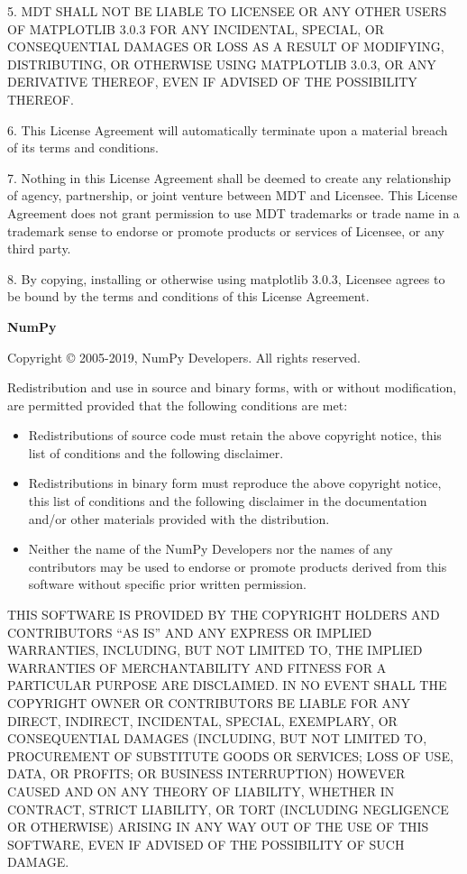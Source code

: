 5. MDT SHALL NOT BE LIABLE TO LICENSEE OR ANY OTHER USERS OF MATPLOTLIB 3.0.3 FOR ANY INCIDENTAL, SPECIAL, OR CONSEQUENTIAL DAMAGES OR LOSS AS A RESULT OF MODIFYING, DISTRIBUTING, OR OTHERWISE USING MATPLOTLIB 3.0.3, OR ANY DERIVATIVE THEREOF, EVEN IF ADVISED OF THE POSSIBILITY THEREOF.

6. This License Agreement will automatically terminate upon a material breach of its terms and conditions.

7. Nothing in this License Agreement shall be deemed to create any relationship of agency, partnership, or joint venture between MDT and Licensee. This License Agreement does not grant permission to use MDT trademarks or trade name in a trademark sense to endorse or promote products or services of Licensee, or any third party.

8. By copying, installing or otherwise using matplotlib 3.0.3, Licensee agrees to be bound by the terms and conditions of this License Agreement.
\newpage

\textbf{NumPy}

Copyright © 2005-2019, NumPy Developers.\newline
All rights reserved.

Redistribution and use in source and binary forms, with or without modification, are permitted provided that the following conditions are met:

\begin{itemize}
	\item Redistributions of source code must retain the above copyright notice, this list of conditions and the following disclaimer.
	\item Redistributions in binary form must reproduce the above copyright notice, this list of conditions and the following disclaimer in the documentation and/or other materials provided with the distribution.
	\item Neither the name of the NumPy Developers nor the names of any contributors may be used to endorse or promote products derived from this software without specific prior written permission.	
\end{itemize}

THIS SOFTWARE IS PROVIDED BY THE COPYRIGHT HOLDERS AND CONTRIBUTORS “AS IS” AND ANY EXPRESS OR IMPLIED WARRANTIES, INCLUDING, BUT NOT LIMITED TO, THE IMPLIED WARRANTIES OF MERCHANTABILITY AND FITNESS FOR A PARTICULAR PURPOSE ARE DISCLAIMED. IN NO EVENT SHALL THE COPYRIGHT OWNER OR CONTRIBUTORS BE LIABLE FOR ANY DIRECT, INDIRECT, INCIDENTAL, SPECIAL, EXEMPLARY, OR CONSEQUENTIAL DAMAGES (INCLUDING, BUT NOT LIMITED TO, PROCUREMENT OF SUBSTITUTE GOODS OR SERVICES; LOSS OF USE, DATA, OR PROFITS; OR BUSINESS INTERRUPTION) HOWEVER CAUSED AND ON ANY THEORY OF LIABILITY, WHETHER IN CONTRACT, STRICT LIABILITY, OR TORT (INCLUDING NEGLIGENCE OR OTHERWISE) ARISING IN ANY WAY OUT OF THE USE OF THIS SOFTWARE, EVEN IF ADVISED OF THE POSSIBILITY OF SUCH DAMAGE.

